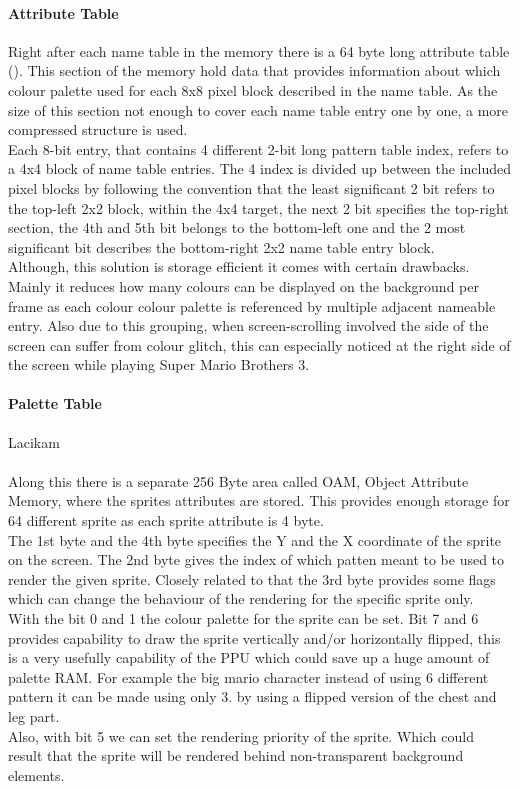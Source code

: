 \documentclass[]{report}
\begin{document}
\paragraph{Attribute Table}
Right after each name table in the memory there is a 64 byte long attribute table (\cite{ATRT}). This section of the memory hold data that provides information about which colour palette used for each 8x8 pixel block described in the name table. As the size of this section not enough to cover each name table entry one by one, a more compressed structure is used.
\\
Each 8-bit entry, that contains 4 different 2-bit long pattern table index, refers to a 4x4 block of name table entries. The 4 index is divided up between the included pixel blocks by following the convention that the least significant 2 bit refers to the top-left 2x2 block, within the 4x4 target, the next 2 bit specifies the top-right section, the 4th and 5th bit belongs to the bottom-left one and the 2 most significant bit describes the bottom-right 2x2 name table entry block.
\\
Although, this solution is storage efficient it comes with certain drawbacks. Mainly it reduces how many colours can be displayed on the background per frame as each colour colour palette is referenced by multiple adjacent nameable entry. Also due to this grouping, when screen-scrolling involved the side of the screen can suffer from colour glitch, this can especially noticed at the right side of the screen while playing Super Mario Brothers 3.

\paragraph{Palette Table}
Lacikam

\paragraph{ }
Along this there is a separate 256 Byte area called OAM, Object Attribute Memory, where the sprites attributes are stored. This provides enough storage for 64 different sprite as each sprite attribute is 4 byte. 
\\
The 1st byte and the 4th byte specifies the Y and the X coordinate of the sprite on the screen. The 2nd byte gives the index of which patten meant to be used to render the given sprite. Closely related to that the 3rd byte provides some flags which can change the behaviour of the rendering for the specific sprite only. 
\\
With the bit 0 and 1 the colour palette for the sprite can be set. Bit 7 and 6 provides capability to draw the sprite vertically and/or horizontally flipped, this is a very usefully capability of the PPU which could save up a huge amount of palette RAM. For example the big mario character instead of using 6 different pattern it can be made using only 3. by using a flipped version of the chest and leg part.
\\
 Also, with bit 5 we can set the rendering priority of the sprite. Which could result that the sprite will be rendered behind non-transparent background elements.
 
\end{document}
